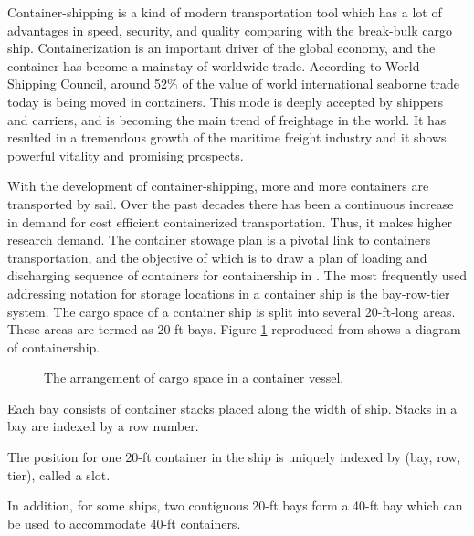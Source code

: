 \documentclass[review,3p,times,authoryear,12pt]{elsarticle}
\begin{document}
Container-shipping is a kind of modern transportation tool which has a lot of advantages in speed, security, and quality comparing with the break-bulk cargo ship.
Containerization is an important driver of the global economy, and the container has become a mainstay of worldwide trade.
According to World Shipping Council, around 52\% of the value of world international seaborne trade today is being moved in containers.
This mode is deeply accepted by shippers and carriers, and is becoming the main trend of freightage in the world.
It has resulted in a tremendous growth of the maritime freight industry and it shows powerful vitality and promising prospects.

With the development of container-shipping, more and more containers are transported by sail.
Over the past decades there has been a continuous increase in demand for cost efficient containerized transportation.
Thus, it makes higher research demand.
The container stowage plan is a pivotal link to containers transportation, and the objective of which is to draw a plan of loading and discharging sequence of containers for containership in \cite{zhang2008review}.
The most frequently used addressing notation for storage locations in a container ship is the bay-row-tier system.
The cargo space of a container ship is split into several 20-ft-long areas.
These areas are termed as 20-ft bays. Figure \ref{fig 1:graph} reproduced from \cite{delgado2012constraint} shows a diagram of containership.
\begin{figure}[htbp]
\center
\setlength{\abovecaptionskip}{10pt}
\caption{The arrangement of cargo space in a container vessel.}
\label{fig 1:graph}
\end{figure}

Each bay consists of container stacks placed along the width of ship.
Stacks in a bay are indexed by a row number.

The position for one 20-ft container in the ship is uniquely indexed by (bay, row, tier), called a slot.

In addition, for some ships, two contiguous 20-ft bays form a 40-ft bay which can be used to accommodate 40-ft containers.
\end{document}
